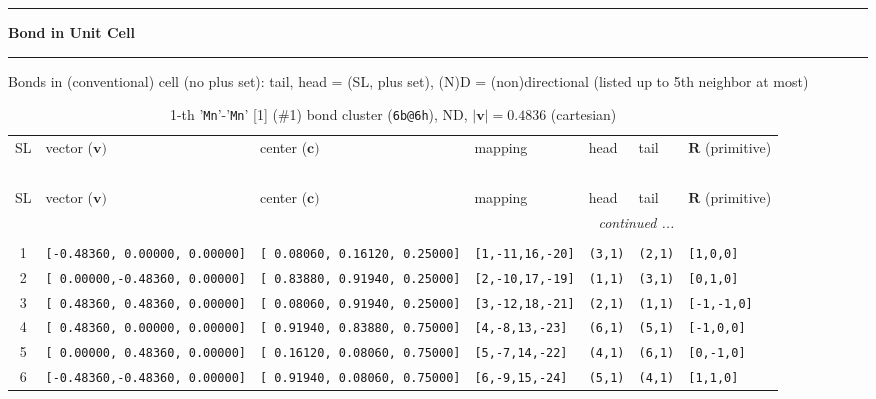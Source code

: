 \documentclass[fleqn,10pt,landscape]{jsarticle}
\begin{document}
\vspace{5mm}
\noindent \rule[0.5mm]{5mm}{0.5mm}\hspace{3mm}\textbf{Bond in Unit Cell}\hspace{3mm}\leaders\hrule height 0.5mm\hfill\kern0pt
\vspace{3mm}

\noindent Bonds in (conventional) cell (no plus set): tail, head = (SL, plus set), (N)D = (non)directional (listed up to 5th neighbor at most)

\renewcommand{\arraystretch}{1.6}
\begin{longtable}[l]{cllllll}
\captionsetup{justification=raggedright, singlelinecheck=off}
\caption{1-th '\texttt{Mn}'-'\texttt{Mn}' [1] (\#1) bond cluster (\texttt{6b@6h}), ND, $|\bm{v}|=0.4836$ (cartesian)}
 \\
 \hline \hline
SL & vector ($\bm{v})$ & center ($\bm{c})$ & mapping & head & tail & $\bm{R}$ (primitive) \\ \hline \endfirsthead

\multicolumn{6}{l}{\tablename\ \thetable{}} \\
 \hline \hline
SL & vector ($\bm{v})$ & center ($\bm{c})$ & mapping & head & tail & $\bm{R}$ (primitive) \\ \hline \endhead

 \hline \hline
\multicolumn{6}{r}{\footnotesize\it continued ...} \\ \endfoot

 \hline \hline
\multicolumn{6}{r}{} \\ \endlastfoot

1 & \texttt{[-0.48360, 0.00000, 0.00000]} & \texttt{[ 0.08060, 0.16120, 0.25000]} & \texttt{[1,-11,16,-20]} & \texttt{(3,1)} & \texttt{(2,1)} & \texttt{[1,0,0]} \\ \hline
2 & \texttt{[ 0.00000,-0.48360, 0.00000]} & \texttt{[ 0.83880, 0.91940, 0.25000]} & \texttt{[2,-10,17,-19]} & \texttt{(1,1)} & \texttt{(3,1)} & \texttt{[0,1,0]} \\ \hline
3 & \texttt{[ 0.48360, 0.48360, 0.00000]} & \texttt{[ 0.08060, 0.91940, 0.25000]} & \texttt{[3,-12,18,-21]} & \texttt{(2,1)} & \texttt{(1,1)} & \texttt{[-1,-1,0]} \\ \hline
4 & \texttt{[ 0.48360, 0.00000, 0.00000]} & \texttt{[ 0.91940, 0.83880, 0.75000]} & \texttt{[4,-8,13,-23]} & \texttt{(6,1)} & \texttt{(5,1)} & \texttt{[-1,0,0]} \\ \hline
5 & \texttt{[ 0.00000, 0.48360, 0.00000]} & \texttt{[ 0.16120, 0.08060, 0.75000]} & \texttt{[5,-7,14,-22]} & \texttt{(4,1)} & \texttt{(6,1)} & \texttt{[0,-1,0]} \\ \hline
6 & \texttt{[-0.48360,-0.48360, 0.00000]} & \texttt{[ 0.91940, 0.08060, 0.75000]} & \texttt{[6,-9,15,-24]} & \texttt{(5,1)} & \texttt{(4,1)} & \texttt{[1,1,0]} \\
\end{longtable}
\end{document}
